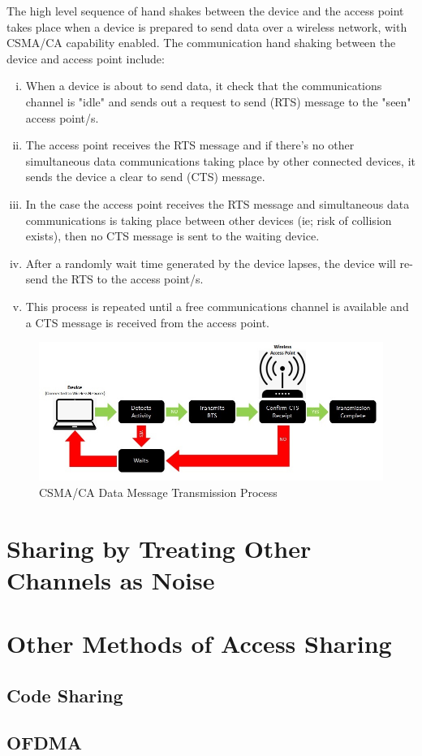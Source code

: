 The high level sequence of hand shakes between the device and the access point takes place when a device is  prepared to send data over a wireless network, with CSMA/CA capability enabled. The communication hand shaking between the device and access point include:

\begin{enumerate}[(i)]

\item When a device is about to send data, it check that the communications channel is "idle" and sends out a request to send (RTS) message to the "seen" access point/s.
\item The access point receives the RTS message and if there's no other simultaneous data communications taking place by other connected devices, it sends the device a clear to send (CTS) message.
\item In the case the access point receives the RTS message and simultaneous data communications is taking place between other devices (ie; risk of collision exists), then no CTS message is sent to the waiting device.
\item After a randomly wait time generated by the device lapses, the device will re-send the RTS to the access point/s.
\item This process is repeated until a free communications channel is available and a CTS message is received from the access point.

\end{enumerate}

\begin{figure}
\centering
	\includegraphics[width=12cm]{CSMA_CA}
	\caption{CSMA/CA Data Message Transmission Process}
	\label{CSMA_CA}
\end{figure}


\section{Sharing by Treating Other Channels as Noise}

\section{Other Methods of Access Sharing}

\subsection{Code Sharing}

\subsection{OFDMA}
